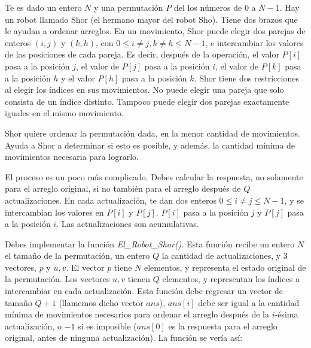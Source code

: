 \documentclass[12pt]{scrartcl}
\begin{document}
    
    
    \vspace{10pt}

    

        Te es dado un entero $N$ y una permutación $P$ del los números de $0$ a $N - 1$. Hay un robot llamado Shor (el hermano mayor del robot Sho). Tiene dos brazos que le ayudan a ordenar arreglos. En un movimiento, Shor puede elegir dos parejas de enteros $(i, j)$ y $(k, h)$, con $0 \le i \neq j, k \neq h \le N - 1$, e intercambiar los valores de las posiciones de cada pareja. Es decir, después de la operación, el valor $P[i]$ pasa a la posición $j$, el valor de $P[j]$ pasa a la posición $i$, el valor de $P[k]$ pasa a la posición $h$ y el valor $P[h]$ pasa a la posición $k$. Shor tiene dos restricciones al elegir los índices en sus movimientos. No puede elegir una pareja que solo consista de un índice distinto. Tampoco puede elegir dos parejas exactamente iguales en el mismo movimiento. 

        Shor quiere ordenar la permutación dada, en la menor cantidad de movimientos. Ayuda a Shor a determinar si esto es posible, y además, la cantidad mínima de movimientos necesaria para lograrlo. 
        
        El proceso es un poco más complicado. Debes calcular la respuesta, no solamente para el arreglo original, si no también para el arreglo después de $Q$ actualizaciones. En cada actualización, te dan dos enteros $0 \le i \neq j \le N - 1$, y se intercambian los valores en $P[i]$ y $P[j]$. $P[i]$ pasa a la posición $j$ y $P[j]$ pasa a la posición $i$. Las actualizaciones son acumulativas. 

        

        Debes implementar la función \textit{El\_Robot\_Shor()}. Esta función recibe un entero $N$ el tamaño de la permutación, un entero $Q$ la cantidad de actualizaciones, y 3 vectores, $p$ y $u, v$. El vector $p$ tiene $N$ elementos, y representa el estado original de la permutación. Los vectores $u, v$ tienen $Q$ elementos, y representan los índices a intercambiar en cada actualización. Esta función debe regresar un vector de tamaño $Q + 1$ (llamemos dicho vector $ans$), $ans[i]$ debe ser igual a la cantidad mínima de movimientos necesarios para ordenar el arreglo después de la $i$-ésima actualización, o $-1$ si es imposible ($ans[0]$ es la respuesta para el arreglo original, antes de ninguna actualización).
        La función se vería así:
\end{document}
